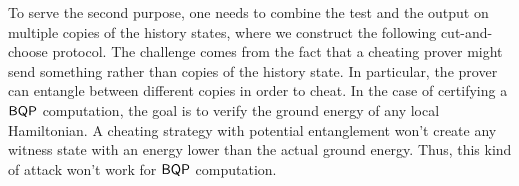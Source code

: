 To serve the second purpose, one needs to combine the test and the output on multiple copies of the history states, where we construct the following cut-and-choose protocol.  
The challenge comes from the fact that a cheating prover might send something rather than copies of the history state.
In particular, the prover can entangle between different copies in order to cheat.
In the case of certifying a $\operatorname{\mathsf{BQP}}$ computation, the goal is to verify the ground energy of any local Hamiltonian.
A cheating strategy with potential entanglement won't create any witness state with an energy lower than the actual ground energy.
Thus, this kind of attack won't work for $\operatorname{\mathsf{BQP}}$ computation.

